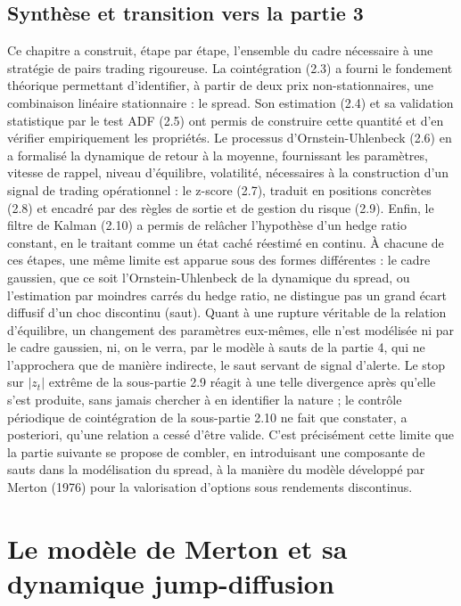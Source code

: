 \documentclass{article}
\begin{document}
\subsection{Synthèse et transition vers la partie 3}
Ce chapitre a construit, étape par étape, l'ensemble du cadre nécessaire à une stratégie de pairs trading rigoureuse. La cointégration (2.3) a fourni le fondement théorique permettant d'identifier, à partir de deux prix non-stationnaires, une combinaison linéaire stationnaire : le spread. Son estimation (2.4) et sa validation statistique par le test ADF (2.5) ont permis de construire cette quantité et d'en vérifier empiriquement les propriétés. Le processus d'Ornstein-Uhlenbeck (2.6) en a formalisé la dynamique de retour à la moyenne, fournissant les paramètres, vitesse de rappel, niveau d'équilibre, volatilité, nécessaires à la construction d'un signal de trading opérationnel : le z-score (2.7), traduit en positions concrètes (2.8) et encadré par des règles de sortie et de gestion du risque (2.9). Enfin, le filtre de Kalman (2.10) a permis de relâcher l'hypothèse d'un hedge ratio constant, en le traitant comme un état caché réestimé en continu.
À chacune de ces étapes, une même limite est apparue sous des formes différentes : le cadre gaussien, que ce soit l'Ornstein-Uhlenbeck de la dynamique du spread, ou l'estimation par moindres carrés du hedge ratio, ne distingue pas un grand écart diffusif d'un choc discontinu (saut). Quant à une rupture véritable de la relation d'équilibre, un changement des paramètres eux-mêmes, elle n'est modélisée ni par le cadre gaussien, ni, on le verra, par le modèle à sauts de la partie 4, qui ne l'approchera que de manière indirecte, le saut servant de signal d'alerte. Le stop sur $|z_t|$ extrême de la sous-partie 2.9 réagit à une telle divergence après qu'elle s'est produite, sans jamais chercher à en identifier la nature ; le contrôle périodique de cointégration de la sous-partie 2.10 ne fait que constater, a posteriori, qu'une relation a cessé d'être valide.
C'est précisément cette limite que la partie suivante se propose de combler, en introduisant une composante de sauts dans la modélisation du spread, à la manière du modèle développé par Merton (1976) pour la valorisation d'options sous rendements discontinus.
\section{Le modèle de Merton et sa dynamique jump-diffusion}
\end{document}
